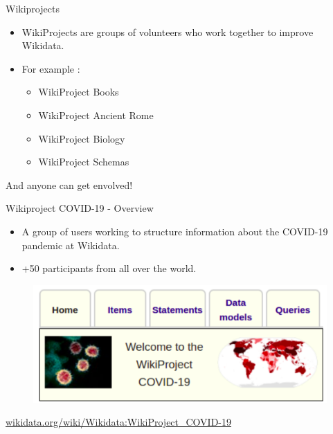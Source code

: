 \documentclass{beamer}
\begin{document}
\begin{frame}{Wikiprojects}

\begin{itemize}
    \item WikiProjects are groups of volunteers who work together to improve Wikidata.
    \item For example :
    \begin{itemize}
        \item WikiProject Books
        \item WikiProject Ancient Rome
        \item WikiProject Biology
        \item WikiProject Schemas
    \end{itemize}
\vskip 1cm
\end{itemize}
And anyone can get envolved!

\end{frame}


\begin{frame}{Wikiproject COVID-19 - Overview}

\begin{itemize}
    \item A group of users working to structure information about the COVID-19 pandemic at Wikidata.
    \item +50 participants from all over the world.
\end{itemize}

\begin{figure}
\includegraphics[scale=0.65]{fig/covid_banner.png}
\end{figure}
\vskip 2cm

\url{wikidata.org/wiki/Wikidata:WikiProject_COVID-19}

\end{frame}
\end{document}
